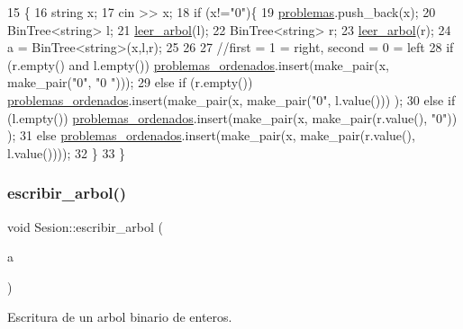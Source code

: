 \begin{DoxyCode}
15                                           \{
16   \textcolor{keywordtype}{string} x;
17   cin >> x;
18   \textcolor{keywordflow}{if} (x!=\textcolor{stringliteral}{"0"})\{
19   \mbox{\hyperlink{class_sesion_af3929f5b3478c9ab1334b4c62566d69e}{problemas}}.push\_back(x);
20   BinTree<string> l;
21   \mbox{\hyperlink{class_sesion_adea0f5f335e3eab364dfc59c28d790f3}{leer\_arbol}}(l);
22   BinTree<string> r;
23   \mbox{\hyperlink{class_sesion_adea0f5f335e3eab364dfc59c28d790f3}{leer\_arbol}}(r);
24   a = BinTree<string>(x,l,r);
25 
26 
27   \textcolor{comment}{//first = 1 = right, second = 0 = left}
28   \textcolor{keywordflow}{if} (r.empty() and l.empty()) \mbox{\hyperlink{class_sesion_a4f770d029f7be9368a3abec6af7e8de7}{problemas\_ordenados}}.insert(make\_pair(x, make\_pair(\textcolor{stringliteral}{"0"}, \textcolor{stringliteral}{"0
      "})));
29   \textcolor{keywordflow}{else} \textcolor{keywordflow}{if} (r.empty()) \mbox{\hyperlink{class_sesion_a4f770d029f7be9368a3abec6af7e8de7}{problemas\_ordenados}}.insert(make\_pair(x, make\_pair(\textcolor{stringliteral}{"0"}, l.value()))
      );
30   \textcolor{keywordflow}{else} \textcolor{keywordflow}{if} (l.empty()) \mbox{\hyperlink{class_sesion_a4f770d029f7be9368a3abec6af7e8de7}{problemas\_ordenados}}.insert(make\_pair(x, make\_pair(r.value(), \textcolor{stringliteral}{"0"}))
      );
31   \textcolor{keywordflow}{else} \mbox{\hyperlink{class_sesion_a4f770d029f7be9368a3abec6af7e8de7}{problemas\_ordenados}}.insert(make\_pair(x, make\_pair(r.value(), l.value())));
32   \}
33 \}
\end{DoxyCode}
\mbox{\label{class_sesion_a05641874607ce3a3b3c495437938bf02}} 
\subsubsection{\texorpdfstring{escribir\+\_\+arbol()}{escribir\_arbol()}}
{\footnotesize\ttfamily void Sesion\+::escribir\+\_\+arbol (\begin{DoxyParamCaption}\item[{const Bin\+Tree$<$ string $>$ \&}]{a }\end{DoxyParamCaption})\hspace{0.3cm}{\ttfamily [private]}}



Escritura de un arbol binario de enteros. 

